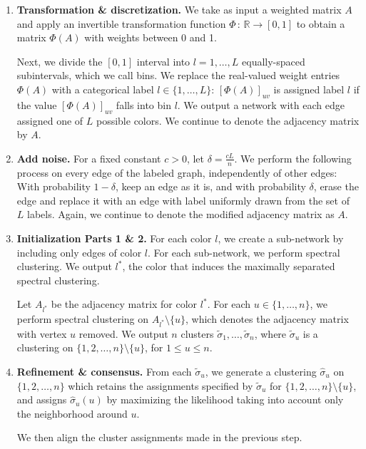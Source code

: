\documentclass{article}
\begin{document}
\begin{enumerate}
\item \textbf{Transformation \& discretization.} We take as input a weighted matrix $A$ and apply an invertible transformation function $\Phi \,:\, \mathbb{R} \rightarrow [0,1]$ to obtain a matrix $\Phi(A)$ with weights between 0 and 1.

Next, we divide the $[0,1]$ interval into $l=1, \dots, L$ equally-spaced subintervals, which we call bins. We replace the real-valued weight entries $\Phi(A)$ with a categorical label $l \in \{1, \dots, L\}$: $[\Phi(A)]_{uv}$ is assigned label $l$ if the value $[\Phi(A)]_{uv}$ falls into bin $l$. We output a network with each edge assigned one of $L$ possible colors. We continue to denote the adjacency matrix by $A$.

\item \textbf{Add noise.} For a fixed constant $c > 0$, let $\delta = \frac{cL}{n}$. We perform the following process on every edge of the labeled graph, independently of other edges: With probability $1-\delta$, keep an edge as it is, and with probability $\delta$, erase the edge and replace it with an edge with label uniformly drawn from the set of $L$ labels. Again, we continue to denote the modified adjacency matrix as $A$.

\item \textbf{Initialization Parts 1 \& 2.} For each color $l$, we create a sub-network by including only edges of color $l$. For each sub-network, we perform spectral clustering. We output $l^*$, the color that induces the maximally separated spectral clustering. 

Let $A_{l^*}$ be the adjacency matrix for color $l^*$. For each $u \in \{1, \dots, n\}$, we perform spectral clustering on $A_{l^*} \setminus \{u\}$, which denotes the adjacency matrix with vertex $u$ removed. We output $n$ clusters $\tilde{\sigma}_1, \dots, \tilde{\sigma}_n$, where $\tilde \sigma_u$ is a clustering on $\{1, 2, \dots, n\} \setminus \{u\}$, for $1 \leq u \leq n$.

\item \textbf{Refinement \& consensus.} From each $\tilde \sigma_u$, we generate a clustering $\hat \sigma_u$ on $\{1, 2, \dots, n\}$ which retains the assignments specified by $\tilde \sigma_u$ for $\{1, 2, \dots, n\} \setminus \{u\}$, and assigns $\hat \sigma_u(u)$ by maximizing the likelihood taking into account only the neighborhood around $u$. 

We then align the cluster assignments made in the previous step. 
\end{enumerate}
\end{document}
